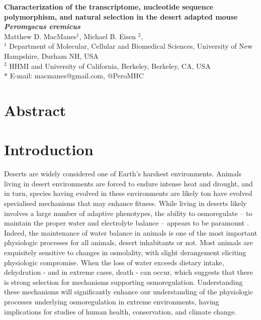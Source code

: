 \documentclass[11pt]{article}
\date{}
\begin{document}
\begin{flushleft}
{\Large
\textbf{Characterization of the transcriptome, nucleotide sequence polymorphism, and natural selection in the desert adapted mouse \textit{Peromyscus eremicus}}
}
\\
Matthew D. MacManes$^{1}$, 
Michael B. Eisen $^{2}$, 
\\
$^{1}$ Department of Molecular, Cellular and Biomedical Sciences, University of New Hampshire, Durham NH, USA
\\
$^{2}$ HHMI and University of California, Berkeley, Berkeley, CA, USA
\\
$\ast$ E-mail: macmanes@gmail.com, @PeroMHC
\end{flushleft}

\linenumbers

\section*{Abstract}



\section*{Introduction}

Deserts are widely considered one of Earth's harshest environments. Animals living in desert environments are forced to endure intense heat and drought, and in turn, species having evolved in these environments are likely ton have evolved specialised mechanisms that may enhance fitness. While living in deserts likely involves a large number of adaptive phenotypes, the ability to osmoregulate -- to maintain the proper water and electrolyte balance -- appears to be paramount \cite{Walsberg:2000uu}. Indeed, the maintenance of water balance in animals is one of the most important physiologic processes for all animals, desert inhabitants or not. Most animals are exquisitely sensitive to changes in osmolality, with slight derangement eliciting physiologic compromise.  When the loss of water exceeds dietary intake, dehydration - and in extreme cases, death - can occur, which suggests that there is strong selection for mechanisms supporting osmoregulation. Understanding these mechanisms will significantly enhance our understanding of the physiologic processes underlying osmoregulation in extreme environments, having implications for studies of human health, conservation, and climate change. \\
\end{document}

